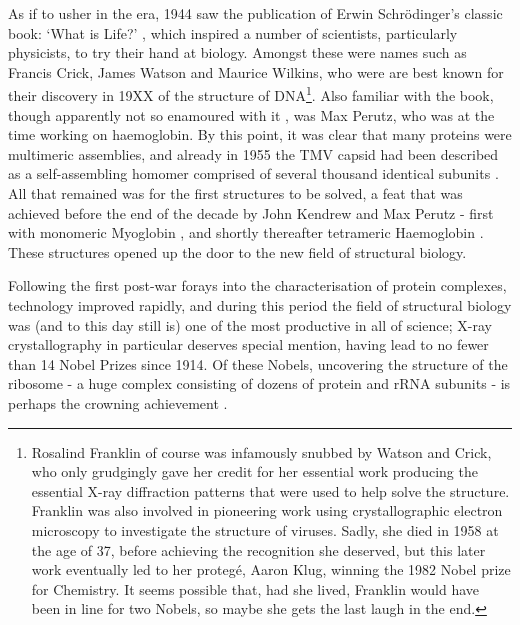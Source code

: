 \documentclass[a4paper,11pt,twoside,openright]{scrbook}
\begin{document}
As if to usher in the era, 1944 saw the publication of Erwin Schrödinger's classic book: `What is Life?' \cite{Schrodinger1947}, which inspired a number of scientists, particularly physicists, to try their hand at biology. Amongst these were names such as Francis Crick, James Watson and Maurice Wilkins, who were are best known for their discovery in 19XX of the structure of DNA\footnote{Rosalind Franklin of course was infamously snubbed by Watson and Crick, who only grudgingly gave her credit for her essential work producing the essential X-ray diffraction patterns that were used to help solve the structure. Franklin was also involved in pioneering work using crystallographic electron microscopy to investigate the structure of viruses. Sadly, she died in 1958 at the age of 37, before achieving the recognition she deserved, but this later work eventually led to her proteg{\'e},  Aaron Klug, winning the 1982 Nobel prize for Chemistry. It seems possible that, had she lived, Franklin would have been in line for two Nobels, so maybe she gets the last laugh in the end.}. Also familiar with the book, though apparently not so enamoured with it \cite{Dronamraju1999}, was Max Perutz, who was at the time working on haemoglobin. By this point, it was clear that many proteins were multimeric assemblies, and already in 1955 the TMV capsid had been described as a self-assembling homomer comprised of several thousand identical subunits \cite{Fraenkel-Conrat1955}. All that remained was for the first structures to be solved, a feat that was achieved before the end of the decade by John Kendrew and Max Perutz - first with monomeric Myoglobin \cite{Kendrew1958}, and shortly thereafter tetrameric Haemoglobin \cite{Perutz1960}. These structures opened up the door to the new field of structural biology.

Following the first post-war forays into the characterisation of protein complexes, technology improved rapidly, and during this period the field of structural biology was (and to this day still is) one of the most productive in all of science; X-ray crystallography in particular deserves special mention, having lead to no fewer than 14 Nobel Prizes since 1914. Of these Nobels, uncovering the structure of the ribosome - a huge complex consisting of dozens of protein and rRNA subunits - is perhaps the crowning achievement \cite{Schluenzen2000,Ramakrishnan2000,Ban2000}.
\end{document}
